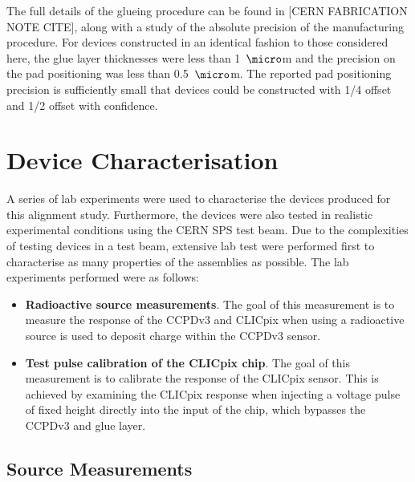 The full details of the glueing procedure can be found in [CERN FABRICATION NOTE CITE], along with a study of the absolute precision of the manufacturing procedure.  For devices constructed in an identical fashion to those considered here, the glue layer thicknesses were less than 1~${\micro}$m and the precision on the pad positioning was less than 0.5~${\micro}$m.   The reported pad positioning precision is sufficiently small that devices could be constructed with 1/4 offset and 1/2 offset with confidence.


\section{Device Characterisation}
A series of lab experiments were used to characterise the devices produced for this alignment study.  Furthermore, the devices were also tested in realistic experimental conditions using the CERN SPS test beam.  Due to the complexities of testing devices in a test beam, extensive lab test were performed first to characterise as many properties of the assemblies as possible.  The lab experiments performed were as follows:

\begin{itemize}
\item \textbf{Radioactive source measurements}.  The goal of this measurement is to measure the response of the CCPDv3 and CLICpix when using a radioactive source is used to deposit charge within the CCPDv3 sensor.  
\item \textbf{Test pulse calibration of the CLICpix chip}.  The goal of this measurement is to calibrate the response of the CLICpix sensor.  This is achieved by examining the CLICpix response when injecting a voltage pulse of fixed height directly into the input of the chip, which bypasses the CCPDv3 and glue layer.
\end{itemize} 


\subsection{Source Measurements}
\label{sec:source}

